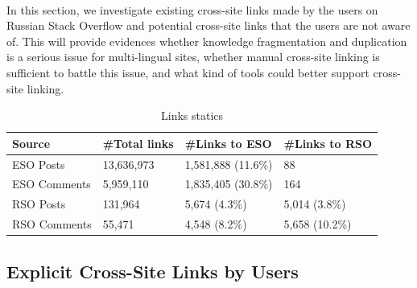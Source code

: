 \vspace{2mm}
\noindent {}
\\

In this section, we investigate existing cross-site links made by the users on Russian Stack Overflow and potential cross-site links that the users are not aware of.
This will provide evidences whether knowledge fragmentation and duplication is a serious issue for multi-lingual sites, whether manual cross-site linking is sufficient to battle this issue, and what kind of tools could better support cross-site linking.

\begin{table}
	\caption{Links statics}
	\centering
	\small
	\label{tab:links}
	\begin{tabular}{llll}
       \hline
		\textbf{Source}      & \textbf{\#Total links} & \textbf{\#Links to ESO}   & \textbf{\#Links to RSO} \\ 
		\hline
		ESO Posts     & 13,636,973    & 1,581,888 (11.6\%)      & 88 \\
		ESO Comments  & 5,959,110     & 1,835,405 (30.8\%)    & 164\\
		RSO Posts    & 131,964       & 5,674  (4.3\%)        & 5,014 (3.8\%) \\
		RSO Comments & 55,471        & 4,548  (8.2\%)        & 5,658 (10.2\%) \\
       \hline
	\end{tabular}

\end{table}	



\subsection{Explicit Cross-Site Links by Users}
\label{sec:explicitLink}

